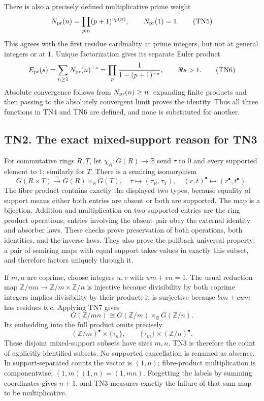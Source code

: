 \documentclass[
  10pt,
  a4paper,
]{article}
\begin{document}
There is also a precisely defined multiplicative prime weight \[
N_{\rm pr}(n)=\prod_{p\mid n}(p+1)^{v_p(n)},\qquad N_{\rm pr}(1)=1.
\tag{TN5}
\] This agrees with the first residue cardinality at prime integers, but
not at general integers or at \(1\). Unique factorization gives its
separate Euler product \[
E_{\rm pr}(s)=\sum_{n\ge1}N_{\rm pr}(n)^{-s}
=\prod_p\frac1{1-(p+1)^{-s}},\qquad \Re s>1.
\tag{TN6}
\] Absolute convergence follows from \(N_{\rm pr}(n)\ge n\); expanding
finite products and then passing to the absolutely convergent limit
proves the identity. Thus all three functions in TN4 and TN6 are
defined, and none is substituted for another.

\subsection{TN2. The exact mixed-support reason for
TN3}\label{tn2.-the-exact-mixed-support-reason-for-tn3}

For commutative rings \(R,T\), let \(\chi_R:G(R)\to\mathbb B\) send
\(\tau\) to \(0\) and every supported element to \(1\); similarly for
\(T\). There is a semiring isomorphism \[
G(R\times T)\xrightarrow{\sim}
G(R)\times_{\mathbb B}G(T),
\quad \tau\longmapsto(\tau_R,\tau_T),\quad
(r,t)^\bullet\longmapsto(r^\bullet,t^\bullet).
\tag{TN7}
\] The fibre product contains exactly the displayed two types, because
equality of support means either both entries are absent or both are
supported. The map is a bijection. Addition and multiplication on two
supported entries are the ring product operations; entries involving the
absent pair obey the external identity and absorber laws. These checks
prove preservation of both operations, both identities, and the inverse
laws. They also prove the pullback universal property: a pair of
semiring maps with equal support takes values in exactly this subset,
and therefore factors uniquely through it.

If \(m,n\) are coprime, choose integers \(u,v\) with \(um+vn=1\). The
usual reduction map \(\mathbb Z/mn\to\mathbb Z/m\times\mathbb Z/n\) is
injective because divisibility by both coprime integers implies
divisibility by their product; it is surjective because \(bvn+cum\) has
residues \(b,c\). Applying TN7 gives \[
G(\mathbb Z/mn)\cong
G(\mathbb Z/m)\times_{\mathbb B}G(\mathbb Z/n).
\tag{TN8}
\] Its embedding into the full product omits precisely \[
(\mathbb Z/m)^\bullet\times\{\tau_n\},\qquad
\{\tau_m\}\times(\mathbb Z/n)^\bullet.
\tag{TN9}
\] These disjoint mixed-support subsets have sizes \(m,n\). TN3 is
therefore the count of explicitly identified subsets. No supported
cancellation is renamed as absence. In support-separated counts the
vector is \((1,n)\); fibre-product multiplication is componentwise,
\((1,m)(1,n)=(1,mn)\). Forgetting the labels by summing coordinates
gives \(n+1\), and TN3 measures exactly the failure of that sum map to
be multiplicative.
\end{document}
